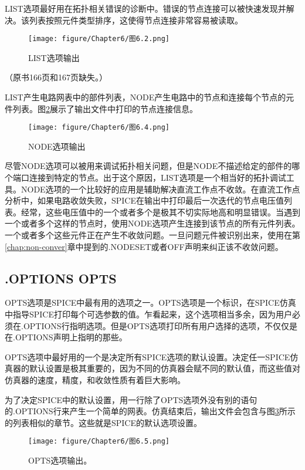 LIST选项最好用在拓扑相关错误的诊断中。错误的节点连接可以被快速发现并解决。该列表按照元件类型排序，这使得节点连接非常容易被读取。

\begin{figure}[htbp]
\small
    \centering
    \texttt{[image: figure/Chapter6/图6.2.png]}
    \caption{LIST选项输出}
    \label{图6.2}
\end{figure}

（原书166页和167页缺失。）

LIST产生电路网表中的部件列表，NODE产生电路中的节点和连接每个节点的元件列表。图\ref{图6.4}展示了输出文件中打印的节点连接信息。
\begin{figure}[htbp]
\small
    \centering
    \texttt{[image: figure/Chapter6/图6.4.png]}
    \caption{NODE选项输出}
    \label{图6.4}
\end{figure}

尽管NODE选项可以被用来调试拓扑相关问题，但是NODE不描述给定的部件的哪个端口连接到特定的节点。出于这个原因，LIST选项是一个相当好的拓扑调试工具。NODE选项的一个比较好的应用是辅助解决直流工作点不收敛。在直流工作点分析中，如果电路收敛失败，SPICE在输出中打印最后一次迭代的节点电压值列表。经常，这些电压值中的一个或者多个是极其不切实际地高和明显错误。当遇到一个或者多个这样的节点时，使用NODE选项产生连接到该节点的所有元件列表。一个或者多个这些元件正在产生不收敛问题。一旦问题元件被识别出来，使用在第\ref{chap:non-conver}章中提到的.NODESET或者OFF声明来纠正该不收敛问题。

\subsection{.OPTIONS OPTS}
OPTS选项是SPICE中最有用的选项之一。OPTS选项是一个标识，在SPICE仿真中指导SPICE打印每个可选参数的值。乍看起来，这个选项相当多余，因为用户必须在.OPTIONS行指明选项。但是OPTS选项打印所有用户选择的选项，不仅仅是在.OPTIONS声明上指明的那些。

OPTS选项中最好用的一个是决定所有SPICE选项的默认设置。决定任一SPICE仿真器的默认设置是极其重要的，因为不同的仿真器会赋不同的默认值，而这些值对仿真器的速度，精度，和收敛性质有着巨大影响。

为了决定SPICE中的默认设置，用一行除了OPTS选项外没有别的语句的.OPTIONS行来产生一个简单的网表。仿真结束后，输出文件会包含与图\ref{图6.5}所示的列表相似的章节。这些就是SPICE的默认选项设置。

\begin{figure}[htbp]
\small
    \centering
    \texttt{[image: figure/Chapter6/图6.5.png]}
    \caption{OPTS选项输出。}
    \label{图6.5}
\end{figure}


